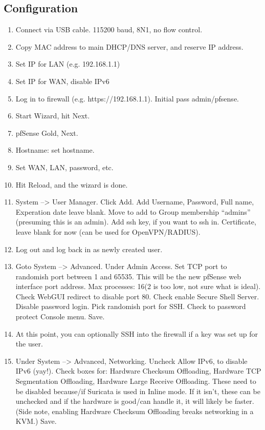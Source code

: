 \subsection{Configuration}
\begin{enumerate}
 \item Connect via USB cable. 115200 baud, 8N1, no flow control.
 \item Copy MAC address to main DHCP/DNS server, and reserve IP address.
 \item Set IP for LAN (e.g. 192.168.1.1)
 \item Set IP for WAN, disable IPv6
 \item Log in to firewall (e.g. https://192.168.1.1).
       Initial pass admin/pfsense.
 \item Start Wizard, hit Next.
 \item pfSense Gold, Next.
 \item Hostname: set hostname.
 \item Set WAN, LAN, password, etc.
 \item Hit Reload, and the wizard is done.
 \item System --> User Manager. Click Add. Add Username, Password, Full name, Experation date leave blank. Move to add to Group membership ``admins'' (presuming this is an admin). Add ssh key, if you want to ssh in. Certificate, leave blank for now (can be used for OpenVPN/RADIUS). 
 \item Log out and log back in as newly created user.
 \item Goto System --> Advanced. Under Admin Access. Set TCP port to randomish port between 1 and 65535. This will be the new pfSense web interface port address. Max processes: 16(2 is too low, not sure what is ideal). Check WebGUI redirect to disable port 80. Check enable Secure Shell Server. Disable password login. Pick randomish port for SSH. Check to password protect Console menu. Save.
 \item At this point, you can optionally SSH into the firewall if a key was set up for the user.
 \item Under System --> Advanced, Networking. Uncheck Allow IPv6, to disable IPv6 (yay!). Check boxes for: Hardware Checksum Offloading, Hardware TCP Segmentation Offloading, Hardware Large Receive Offloading. These need to be disabled because/if Suricata is used in Inline mode. If it isn't, these can be unchecked and if the hardware is good/can handle it, it will likely be faster. (Side note, enabling Hardware Checksum Offloading breaks networking in a KVM.) Save.

\end{enumerate}
